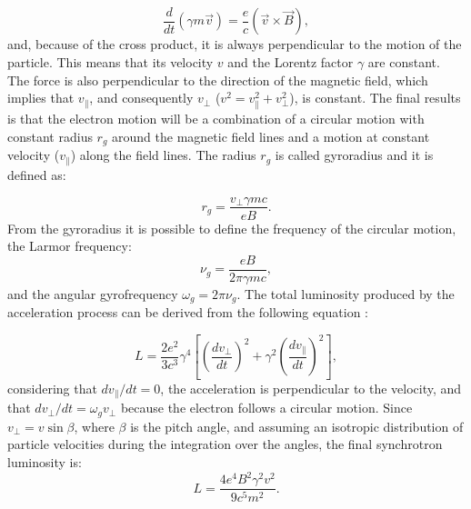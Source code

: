 \documentclass[../main.tex]{subfiles}
\begin{document}
\begin{equation}
    \label{eq:mag_force}
    \frac{d}{dt}(\gamma m \vec{v})=\frac{e}{c}\left(\vec{v}\times\vec{B}\right),
\end{equation}
and, because of the cross product, it is always perpendicular to the motion of the particle.
This means that its velocity $v$ and the Lorentz factor $\gamma$ are constant.
The force is also perpendicular to the direction of the magnetic field, which implies that $v_{\parallel}$, and consequently $v_{\bot}$ ($v^2 = v^2_{\parallel} + v^2_{\bot}$), is constant.
The final results is that the electron motion will be a combination of a circular motion with constant radius $r_g$ around the magnetic field lines and a motion at constant velocity ($v_{\parallel}$) along the field lines.
The radius $r_g$ is called gyroradius and it is defined as:

\begin{equation}
    \label{eq:gyroradius}
    r_g = \frac{v_{\bot}\gamma m c}{e B}.
\end{equation}
From the gyroradius it is possible to define the frequency of the circular motion, the Larmor frequency:
\begin{equation}
    \label{eq:larmor_freq}
    \nu_g = \frac{e B}{2\pi \gamma m c},
\end{equation}
and the angular gyrofrequency $\omega_g = 2\pi \nu_g$.
The total luminosity produced by the acceleration process can be derived from the following equation \citep{Rybicki86}:

\begin{equation}
    \label{eq:rybicki}
    L = \frac{2e^2}{3c^3}\gamma^4\left[\left(\frac{dv_{\bot}}{dt}\right)^2+\gamma^2\left(\frac{dv_{\parallel}}{dt}\right)^2\right],
\end{equation}
considering that $dv_{\parallel}/dt = 0$, the acceleration is perpendicular to the velocity, and that $dv_{\bot}/dt = \omega_gv_{\bot}$ because the electron follows a circular motion.
Since $v_{\bot} = v\sin\beta$, where $\beta$ is the pitch angle, and assuming an isotropic distribution of particle velocities during the integration over the angles, the final synchrotron luminosity is:
\begin{equation}
    \label{eq:sync_lum}
    L  = \frac{4e^4B^2\gamma^2v^2}{9c^5m^2}.
\end{equation}
\end{document}
